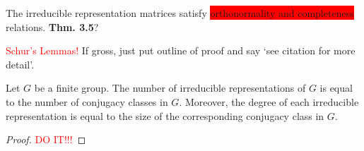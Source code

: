 \begin{example}

\end{example}

The irreducible representation matrices satisfy \colorbox{red}{orthonormality and completeness} relations.\textbf{ Thm. 3.5}?

\textcolor{red}{Schur's Lemmas!}
If gross, just put outline of proof and say `see citation for more detail'.

\begin{theorem}\label{th:irred}
    Let $G$ be a finite group. The number of irreducible representations of $G$ is equal to the number of conjugacy classes in $G$. Moreover, the degree of each irreducible representation is equal to the size of the corresponding conjugacy class in $G$.
\end{theorem}
\begin{proof}
    \textcolor{red}{DO IT!!!}
\end{proof}

